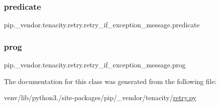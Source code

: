 \subsubsection{\texorpdfstring{predicate}{predicate}}
{\footnotesize\ttfamily pip.\+\_\+vendor.\+tenacity.\+retry.\+retry\+\_\+if\+\_\+exception\+\_\+message.\+predicate\hspace{0.3cm}{\ttfamily [static]}}

\mbox{\label{classpip_1_1__vendor_1_1tenacity_1_1retry_1_1retry__if__exception__message_aa307d1a2709d58c48f5aff176ce20175}} 
\subsubsection{\texorpdfstring{prog}{prog}}
{\footnotesize\ttfamily pip.\+\_\+vendor.\+tenacity.\+retry.\+retry\+\_\+if\+\_\+exception\+\_\+message.\+prog\hspace{0.3cm}{\ttfamily [static]}}



The documentation for this class was generated from the following file\+:\begin{DoxyCompactItemize}
\item 
venv/lib/python3./site-\/packages/pip/\+\_\+vendor/tenacity/\hyperlink{tenacity_2retry_8py}{retry.\+py}\end{DoxyCompactItemize}

